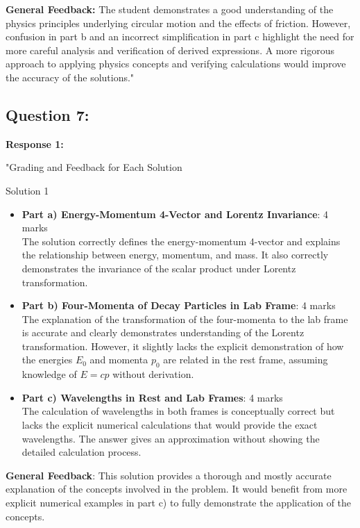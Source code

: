 \documentclass[a4paper,11pt]{article}
\begin{document}
\textbf{General Feedback:} The student demonstrates a good understanding of the physics principles underlying circular motion and the effects of friction. However, confusion in part b and an incorrect simplification in part c highlight the need for more careful analysis and verification of derived expressions. A more rigorous approach to applying physics concepts and verifying calculations would improve the accuracy of the solutions."

\subsection*{Question 7:}

\textbf{Response 1:}

"Grading and Feedback for Each Solution

Solution 1

\begin{itemize}
    \item \textbf{Part a) Energy-Momentum 4-Vector and Lorentz Invariance}: 4 marks \\
    The solution correctly defines the energy-momentum 4-vector and explains the relationship between energy, momentum, and mass. It also correctly demonstrates the invariance of the scalar product under Lorentz transformation.
    
    \item \textbf{Part b) Four-Momenta of Decay Particles in Lab Frame}: 4 marks \\
    The explanation of the transformation of the four-momenta to the lab frame is accurate and clearly demonstrates understanding of the Lorentz transformation. However, it slightly lacks the explicit demonstration of how the energies \(E_0\) and momenta \(p_0\) are related in the rest frame, assuming knowledge of \(E = cp\) without derivation.
    
    \item \textbf{Part c) Wavelengths in Rest and Lab Frames}: 4 marks \\
    The calculation of wavelengths in both frames is conceptually correct but lacks the explicit numerical calculations that would provide the exact wavelengths. The answer gives an approximation without showing the detailed calculation process.
\end{itemize}

\textbf{General Feedback}: This solution provides a thorough and mostly accurate explanation of the concepts involved in the problem. It would benefit from more explicit numerical examples in part c) to fully demonstrate the application of the concepts.
\end{document}
